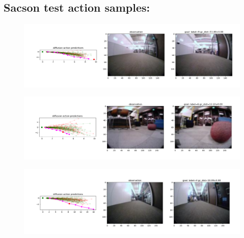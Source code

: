 \documentclass[12pt]{article}
\begin{document}
\subsection*{Sacson test action samples:}
\begin{figure}[H]
    \includegraphics[width=\textwidth]{images/sacson_test_action_samples_1.png}
        \label{fig:sacon_test_action_samples_1}
\end{figure}
\begin{figure}[H]
    \includegraphics[width=\textwidth]{images/sacson_test_action_samples_2.png}
        \label{fig:sacon_test_action_samples_1}
\end{figure}
\begin{figure}[H]
    \includegraphics[width=\textwidth]{images/sacson_test_action_samples_3.png}
        \label{fig:sacon_test_action_samples_1}
\end{figure}
\end{document}
